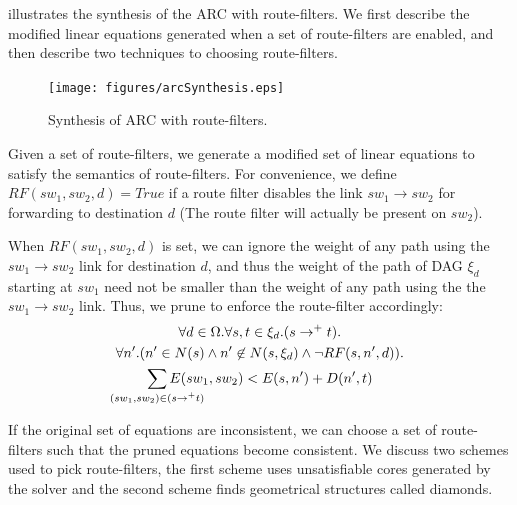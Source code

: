  illustrates the synthesis of 
the ARC with route-filters. We first describe the 
modified linear equations generated when a set of
route-filters are enabled, and then describe two
techniques to choosing route-filters. 
\begin{figure}
	\centering
	\texttt{[image: figures/arcSynthesis.eps]}
	\caption{Synthesis of ARC with route-filters.} \label{fig:arcSynthesis}
\end{figure}

Given a set of route-filters, we generate a modified 
set of linear equations to satisfy the 
semantics of route-filters.
For convenience, we define $RF(sw_1, sw_2, d) = True$ 
if a route filter disables the link $sw_1 \rightarrow sw_2$
for forwarding to destination $d$ (The route filter will
actually be present on $sw_2$). 

When $RF(sw_1, sw_2, d)$ is set, we can ignore the 
weight of any path using the $sw_1 \rightarrow sw_2$
link for destination $d$, and thus 
the weight of the path of DAG $\xi_d$
starting at $sw_1$ need not be smaller than the weight
of any path
using the the $sw_1 \rightarrow sw_2$ link. Thus,
we prune  to enforce the route-filter accordingly:
\begin{multline} \label{eq:uniq}
		\forall d \in \Omega. \forall s, t \in \xi_d. (s \rightarrow^+ t).\\ 
		\forall n'. (n' \in N(s) \wedge n' \not\in N(s, \xi_d) \wedge \neg RF(s,n',d)). \\
		\sum_{\mathclap{\substack{(sw_1, sw_2) \in (s \rightarrow^+ t)}}} 
		E(sw_1, sw_2) < E(s, n') + D(n', t)   
\end{multline}

If the original set of equations are inconsistent, we 
can choose a set of route-filters such that the pruned
equations become consistent. 
We discuss two schemes used to pick route-filters,
the first scheme uses unsatisfiable cores generated
by the solver and the second scheme 
finds geometrical structures called diamonds.



